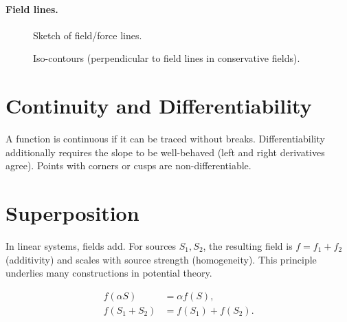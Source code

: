 \documentclass[11pt,a4paper]{article}
\begin{document}
\paragraph{Field lines.}
\begin{figure}[h]
  \centering
  \caption{Sketch of field/force lines.}
\end{figure}

\begin{figure}[h]
  \centering
  \caption{Iso-contours (perpendicular to field lines in conservative fields).}
\end{figure}

\section{Continuity and Differentiability}
A function is continuous if it can be traced without breaks. Differentiability additionally requires the slope to be well-behaved (left and right derivatives agree). Points with corners or cusps are non-differentiable.

\section{Superposition}
In linear systems, fields add. For sources $S_1, S_2$, the resulting field is $f=f_1+f_2$ (additivity) and scales with source strength (homogeneity). This principle underlies many constructions in potential theory.

\begin{align}
  f(\alpha S) &= \alpha f(S),\\
  f(S_1+S_2) &= f(S_1)+f(S_2).
\end{align}
\end{document}
